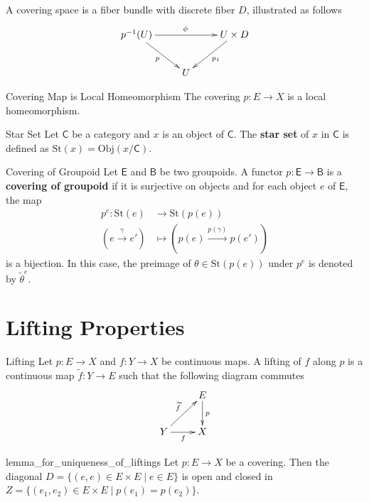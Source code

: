 \documentclass{report}
\begin{document}
A covering space is a fiber bundle with discrete fiber $D$, illustrated as follows
\[\xymatrix{
			p^{-1}(U)\ar[rd]_{p}\ar[rr]^{\phi}  & &U\times D\ar[ld]^{p_1}\\
			&U&
			}\]
\begin{proposition}{Covering Map is Local Homeomorphism}{}
	The covering $p:E\to X$ is a local homeomorphism.
\end{proposition}

\begin{definition}{Star Set}{}
	Let $\mathsf{C}$ be a category and $x$ is an object of $\mathsf{C}$. The \textbf{star set} of $x$ in $\mathsf{C}$ is defined as
	$\mathrm{St}(x)=\mathrm{Obj}\left(x/\mathsf{C}\right)$.
\end{definition}

\begin{definition}{Covering of Groupoid}{}
	Let $\mathsf{E}$ and $\mathsf{B}$ be two groupoids. A functor $p:\mathsf{E}\to\mathsf{B}$ is a \textbf{covering of groupoid} if it is surjective on objects and for each object $e$ of $\mathsf{E}$, the map
	\begin{align*}
		p^{e}:\mathrm{St}(e)&\longrightarrow\mathrm{St}(p(e))\\
		\left(e\xrightarrow{\gamma} e'\right)&\longmapsto \left(p(e)\xrightarrow{p(\gamma)} p(e')\right)
	\end{align*}
	is a bijection. In this case, the preimage of $\theta\in\mathrm{St}(p(e))$ under $p^{e}$ is denoted by $\widetilde{\theta}^e$.
\end{definition}



\section{Lifting Properties}


\begin{definition}{Lifting}{}
	Let $p:E\to X$ and $f:Y\to X$ be continuous maps. A lifting of $f$ along $p$ is a continuous map $\widetilde{f}:Y\to E$ such that the following diagram commutes
	\[\xymatrix{
			& E\ar[d]^{p}\\
			Y\ar[ur]^{\widetilde{f}}\ar[r]_{f} &X
			}\]
\end{definition}




\begin{lemma}{}{lemma_for_uniqueness_of_liftings}
	Let $p: E \rightarrow X$ be a covering. Then the diagonal $D=\{(e, e) \in E \times E \mid e\in E\}$ is open and closed in $Z=\{(e_1, e_2) \in E \times E \mid p(e_1)=p(e_2)\}$.
\end{lemma}
\end{document}
